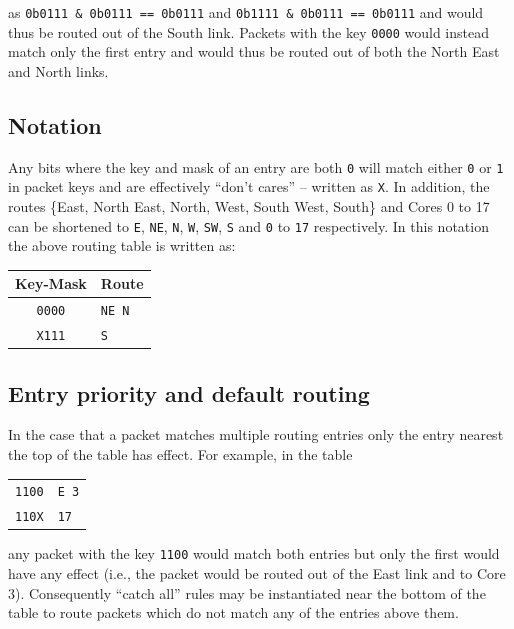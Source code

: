 \documentclass[conference]{IEEEtran}
\newcommand{\mytt}[1]{\texttt{\footnotesize#1}}
\begin{document}
  \noindent as \mytt{0b0111 \& 0b0111 == 0b0111} and \mytt{0b1111 \& 0b0111 == 0b0111} and would thus be routed out of the South link.
  Packets with the key \mytt{0000} would instead match only the first entry and would thus be routed out of both the North East and North links.

  \subsection{Notation}

  Any bits where the key and mask of an entry are both \mytt{0} will match either \mytt{0} or \mytt{1} in packet keys and are effectively ``don't cares'' -- written as \mytt{X}.
  In addition, the routes \{East, North East, North, West, South West, South\} and Cores 0 to 17 can be shortened to \mytt{E}, \mytt{NE}, \mytt{N}, \mytt{W}, \mytt{SW}, \mytt{S} and \mytt{0} to \mytt{17} respectively.
  In this notation the above routing table is written as:

  \begin{table}[H]
    \centering
    \begin{tabular}{c l}
      \toprule
      Key-Mask & Route \\
      \midrule
      \texttt{0000} & \texttt{NE N}\\
      \texttt{X111} & \texttt{S}\\
      \bottomrule
    \end{tabular}
  \end{table}

  \subsection{Entry priority and default routing}

  In the case that a packet matches multiple routing entries only the entry nearest the top of the table has effect.
  For example, in the table

  \begin{table}[H]
    \centering
    \begin{tabular}{c l}
      \toprule
      \texttt{1100} & \texttt{E 3}\\
      \texttt{110X} & \texttt{17}\\
      \bottomrule
    \end{tabular}
  \end{table}

  \noindent any packet with the key \mytt{1100} would match both entries but only the first would have any effect (i.e., the packet would be routed out of the East link and to Core 3).
  Consequently ``catch all'' rules may be instantiated near the bottom of the table to route packets which do not match any of the entries above them.
\end{document}
